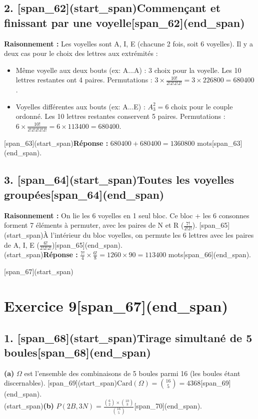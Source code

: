 \documentclass[11pt,a4paper]{article}
\begin{document}
\subsection*{2. [span_62](start_span)Commençant et finissant par une voyelle[span_62](end_span)}
\textbf{Raisonnement :} Les voyelles sont A, I, E (chacune 2 fois, soit 6 voyelles). Il y a deux cas pour le choix des lettres aux extrémités :
\begin{itemize}
    \item Même voyelle aux deux bouts (ex: A...A) : 3 choix pour la voyelle. Les 10 lettres restantes ont 4 paires. Permutations : $3 \times \frac{10!}{2!2!2!2!} = 3 \times 226800 = 680400$.
    \item Voyelles différentes aux bouts (ex: A...E) : $A_3^2 = 6$ choix pour le couple ordonné. Les 10 lettres restantes conservent 5 paires. Permutations : $6 \times \frac{10!}{2!2!2!2!2!} = 6 \times 113400 = 680400$.
\end{itemize}
[span_63](start_span)\textbf{Réponse :} $680400 + 680400 = 1360800$ mots[span_63](end_span).

\subsection*{3. [span_64](start_span)Toutes les voyelles groupées[span_64](end_span)}
\textbf{Raisonnement :} On lie les 6 voyelles en 1 seul bloc. Ce bloc + les 6 consonnes forment 7 éléments à permuter, avec les paires de N et R ($\frac{7!}{2!2!}$). [span_65](start_span)À l'intérieur du bloc voyelles, on permute les 6 lettres avec les paires de A, I, E ($\frac{6!}{2!2!2!}$)[span_65](end_span).\\
[span_66](start_span)\textbf{Réponse :} $\frac{7!}{4} \times \frac{6!}{8} = 1260 \times 90 = 113400$ mots[span_66](end_span).

\hrulefill

[span_67](start_span)\section*{Exercice 9[span_67](end_span)}

\subsection*{1. [span_68](start_span)Tirage simultané de 5 boules[span_68](end_span)}
\textbf{(a)} $\Omega$ est l'ensemble des combinaisons de 5 boules parmi 16 (les boules étant discernables). [span_69](start_span)$\text{Card}(\Omega) = \binom{16}{5} = 4368$[span_69](end_span).\\
[span_70](start_span)\textbf{(b)} $P(2B, 3N) = \frac{\binom{6}{2} \times \binom{10}{3}}{\binom{16}{5}}$[span_70](end_span).
\end{document}

